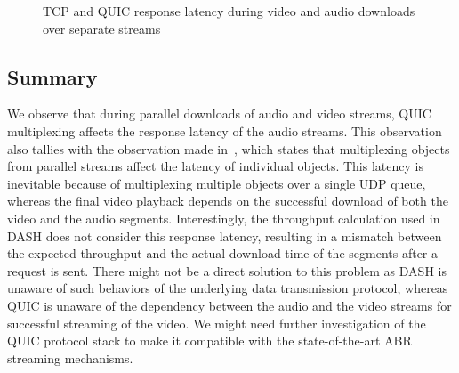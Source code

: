 \begin{figure}[!ht]
	\captionsetup[subfigure]{}
	\begin{center}
           		\hfill
	\end{center}
	\label{fig:chap03s2:dashcompres}
	\caption{TCP and QUIC response latency during video and audio downloads over separate streams}
\end{figure}


\subsection{Summary}
We observe that during parallel downloads of audio and video streams, QUIC multiplexing affects the response latency of the audio streams. This observation also tallies with the observation made in~\cite{kakhki2019taking}, which states that multiplexing objects from parallel streams affect the latency of individual objects. This latency is inevitable because of multiplexing multiple objects over a single UDP queue, whereas the final video playback depends on the successful download of both the video and the audio segments. Interestingly, the throughput calculation used in DASH does not consider this response latency, resulting in a mismatch between the expected throughput and the actual download time of the segments after a request is sent. There might not be a direct solution to this problem as DASH is unaware of such behaviors of the underlying data transmission protocol, whereas QUIC is unaware of the dependency between the audio and the video streams for successful streaming of the video. We might need further investigation of the QUIC protocol stack to make it compatible with the state-of-the-art ABR streaming mechanisms.  

